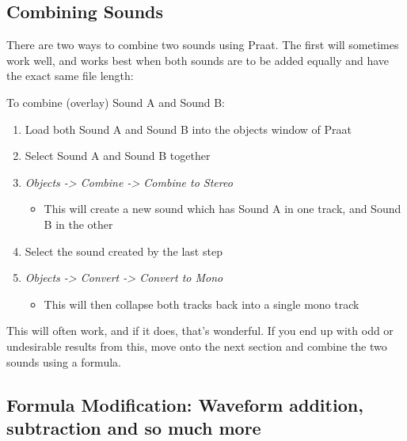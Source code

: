 \documentclass[11pt]{article}
\def\tightlist{}
\begin{document}
\hypertarget{combining-sounds}{%
\subsection{Combining Sounds}\label{combining-sounds}}

There are two ways to combine two sounds using Praat. The first will
sometimes work well, and works best when both sounds are to be added
equally and have the exact same file length:

To combine (overlay) Sound A and Sound B:

\begin{enumerate}
\def\labelenumi{\arabic{enumi}.}
\tightlist
\item
  Load both Sound A and Sound B into the objects window of Praat
\item
  Select Sound A and Sound B together
\item
  \emph{Objects -\textgreater{} Combine -\textgreater{} Combine to
  Stereo}

  \begin{itemize}
  \tightlist
  \item
    This will create a new sound which has Sound A in one track, and
    Sound B in the other
  \end{itemize}
\item
  Select the sound created by the last step
\item
  \emph{Objects -\textgreater{} Convert -\textgreater{} Convert to Mono}

  \begin{itemize}
  \tightlist
  \item
    This will then collapse both tracks back into a single mono track
  \end{itemize}
\end{enumerate}

This will often work, and if it does, that's wonderful. If you end up
with odd or undesirable results from this, move onto the next section
and combine the two sounds using a formula.

\hypertarget{formula-modification-waveform-addition-subtraction-and-so-much-more}{%
\subsection{Formula Modification: Waveform addition, subtraction and so
much
more}\label{formula-modification-waveform-addition-subtraction-and-so-much-more}}

\label{sub:formulas}
\end{document}

